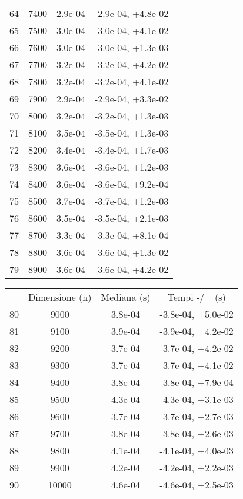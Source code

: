 \begin{table}
\begin{adjustbox}{width=1\textwidth/2}
\begin{tabular}{|c|c|c|c|}
\cline{1-4}
64 & 7400 & 2.9e-04 & -2.9e-04, +4.8e-02 \\
\cline{1-4}
65 & 7500 & 3.0e-04 & -3.0e-04, +4.1e-02 \\
\cline{1-4}
66 & 7600 & 3.0e-04 & -3.0e-04, +1.3e-03 \\
\cline{1-4}
67 & 7700 & 3.2e-04 & -3.2e-04, +4.2e-02 \\
\cline{1-4}
68 & 7800 & 3.2e-04 & -3.2e-04, +4.1e-02 \\
\cline{1-4}
69 & 7900 & 2.9e-04 & -2.9e-04, +3.3e-02 \\
\cline{1-4}
70 & 8000 & 3.2e-04 & -3.2e-04, +1.3e-03 \\
\cline{1-4}
71 & 8100 & 3.5e-04 & -3.5e-04, +1.3e-03 \\
\cline{1-4}
72 & 8200 & 3.4e-04 & -3.4e-04, +1.7e-03 \\
\cline{1-4}
73 & 8300 & 3.6e-04 & -3.6e-04, +1.2e-03 \\
\cline{1-4}
74 & 8400 & 3.6e-04 & -3.6e-04, +9.2e-04 \\
\cline{1-4}
75 & 8500 & 3.7e-04 & -3.7e-04, +1.2e-03 \\
\cline{1-4}
76 & 8600 & 3.5e-04 & -3.5e-04, +2.1e-03 \\
\cline{1-4}
77 & 8700 & 3.3e-04 & -3.3e-04, +8.1e-04 \\
\cline{1-4}
78 & 8800 & 3.6e-04 & -3.6e-04, +1.3e-02 \\
\cline{1-4}
79 & 8900 & 3.6e-04 & -3.6e-04, +4.2e-02 \\
\cline{1-4}
\end{tabular}
\end{adjustbox}
\end{table}

\begin{table}
\centering
\begin{adjustbox}{width=1\textwidth/2}
\begin{tabular}{|c|c|c|c|}
\hline
 & Dimensione (n) & Mediana (s) & Tempi -/+ (s) \\
80 & 9000 & 3.8e-04 & -3.8e-04, +5.0e-02 \\
\cline{1-4}
81 & 9100 & 3.9e-04 & -3.9e-04, +4.2e-02 \\
\cline{1-4}
82 & 9200 & 3.7e-04 & -3.7e-04, +4.2e-02 \\
\cline{1-4}
83 & 9300 & 3.7e-04 & -3.7e-04, +4.1e-02 \\
\cline{1-4}
84 & 9400 & 3.8e-04 & -3.8e-04, +7.9e-04 \\
\cline{1-4}
85 & 9500 & 4.3e-04 & -4.3e-04, +3.1e-03 \\
\cline{1-4}
86 & 9600 & 3.7e-04 & -3.7e-04, +2.7e-03 \\
\cline{1-4}
87 & 9700 & 3.8e-04 & -3.8e-04, +2.6e-03 \\
\cline{1-4}
88 & 9800 & 4.1e-04 & -4.1e-04, +4.0e-03 \\
\cline{1-4}
89 & 9900 & 4.2e-04 & -4.2e-04, +2.2e-03 \\
\cline{1-4}
90 & 10000 & 4.6e-04 & -4.6e-04, +2.5e-03 \\
\cline{1-4}
\end{tabular}
\end{adjustbox}
\end{table}
